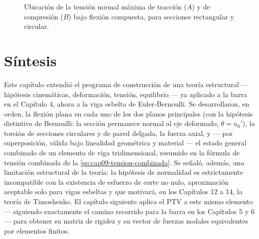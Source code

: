 \begin{figure}[htbp]
\centering
{}
\caption{Ubicación de la tensión normal máxima de tracción ($A$) y de compresión ($B$) bajo flexión compuesta, para secciones rectangular y circular.}
\label{fig:cap09-flexion-compuesta}
\end{figure}

\section{Síntesis}

Este capítulo extendió el programa de construcción de una teoría estructural --- hipótesis cinemáticas, deformación, tensión, equilibrio --- ya aplicado a la barra en el Capítulo 4, ahora a la viga esbelta de Euler-Bernoulli. Se desarrollaron, en orden, la flexión plana en cada uno de los dos planos principales (con la hipótesis distintiva de Bernoulli: la sección permanece normal al eje deformado, $\theta=u_0'$), la torsión de secciones circulares y de pared delgada, la fuerza axial, y --- por superposición, válida bajo linealidad geométrica y material --- el estado general combinado de un elemento de viga tridimensional, resumido en la fórmula de tensión combinada de la \cref{eq:cap09-tension-combinada}. Se señaló, además, una limitación estructural de la teoría: la hipótesis de normalidad es estrictamente incompatible con la existencia de esfuerzo de corte no nulo, aproximación aceptable solo para vigas esbeltas y que motivará, en los Capítulos 12 a 14, la teoría de Timoshenko. El capítulo siguiente aplica el PTV a este mismo elemento --- siguiendo exactamente el camino recorrido para la barra en los Capítulos 5 y 6 --- para obtener su matriz de rigidez y su vector de fuerzas nodales equivalentes por elementos finitos.

